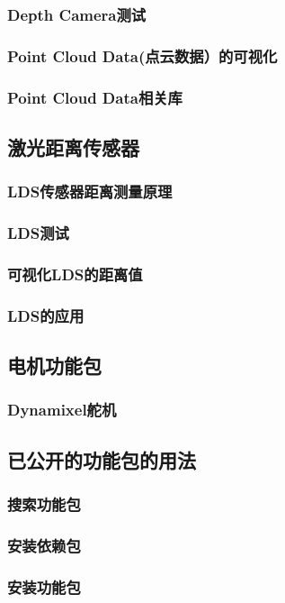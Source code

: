\documentclass[geye,green,kindle,cn]{elegantnote}
\begin{document}
\subsubsection{Depth Camera测试}
\subsubsection{Point Cloud Data(点云数据）的可视化}
\subsubsection{Point Cloud Data相关库}
\subsection{激光距离传感器}
\subsubsection{LDS传感器距离测量原理}
\subsubsection{LDS测试}
\subsubsection{可视化LDS的距离值}
\subsubsection{LDS的应用}
\subsection{电机功能包}
\subsubsection{Dynamixel舵机}
\subsection{已公开的功能包的用法}
\subsubsection{搜索功能包}
\subsubsection{安装依赖包}
\subsubsection{安装功能包}
\end{document}
